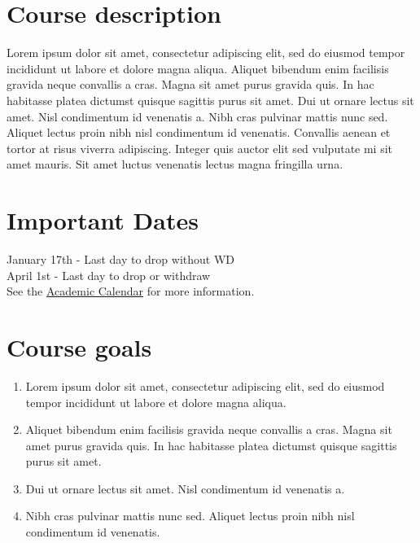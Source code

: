 \documentclass[11pt,]{article}
\begin{document}
	
\vspace{2mm}


\hypertarget{course-description}{%
\section{Course description}\label{course-description}}

Lorem ipsum dolor sit amet, consectetur adipiscing elit, sed do eiusmod
tempor incididunt ut labore et dolore magna aliqua. Aliquet bibendum
enim facilisis gravida neque convallis a cras. Magna sit amet purus
gravida quis. In hac habitasse platea dictumst quisque sagittis purus
sit amet. Dui ut ornare lectus sit amet. Nisl condimentum id venenatis
a. Nibh cras pulvinar mattis nunc sed. Aliquet lectus proin nibh nisl
condimentum id venenatis. Convallis aenean et tortor at risus viverra
adipiscing. Integer quis auctor elit sed vulputate mi sit amet mauris.
Sit amet luctus venenatis lectus magna fringilla urna.

\hypertarget{important-dates}{%
\section{Important Dates}\label{important-dates}}

January 17th - Last day to drop without WD\\
April 1st - Last day to drop or withdraw\\
See the \href{https://www.southalabama.edu/academiccalendar/}{Academic
Calendar} for more information.

\newpage

\hypertarget{course-goals}{%
\section{Course goals}\label{course-goals}}

\begin{enumerate}
\def\labelenumi{\arabic{enumi}.}
\item
  Lorem ipsum dolor sit amet, consectetur adipiscing elit, sed do
  eiusmod tempor incididunt ut labore et dolore magna aliqua.
\item
  Aliquet bibendum enim facilisis gravida neque convallis a cras. Magna
  sit amet purus gravida quis. In hac habitasse platea dictumst quisque
  sagittis purus sit amet.
\item
  Dui ut ornare lectus sit amet. Nisl condimentum id venenatis a.
\item
  Nibh cras pulvinar mattis nunc sed. Aliquet lectus proin nibh nisl
  condimentum id venenatis.
\end{enumerate}
\end{document}
